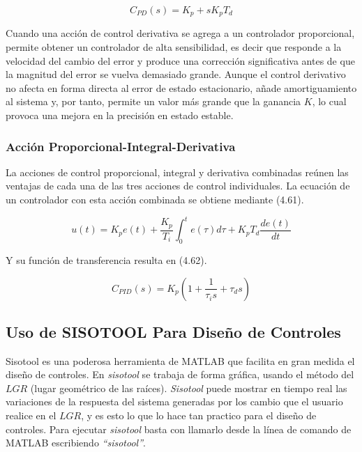 \documentclass[a4paper,12pt,twoside]{proyectotanquesecci}
\begin{document}
\begin{equation}
C_{PD}(s)=K_{p}+sK_{p}T_{d}
\end{equation}

Cuando una acción de control derivativa se agrega a un controlador proporcional, permite obtener un controlador de alta sensibilidad, es decir que responde a la velocidad del cambio del error y produce una corrección significativa antes de que la magnitud del error se vuelva demasiado grande. Aunque el control derivativo no afecta en forma directa al error de estado estacionario, añade amortiguamiento al sistema y, por tanto, permite un valor más grande que la ganancia $K$, lo cual provoca una mejora en la precisión en estado estable.

\subsubsection*{Acción Proporcional-Integral-Derivativa}

La acciones de control proporcional, integral y derivativa combinadas reúnen las ventajas de cada una de las tres acciones de control individuales. La ecuación de un controlador con esta acción combinada se obtiene mediante (4.61).

\begin{equation}
u(t)=K_{p}e(t)+ \frac{K_{p}}{T_{i}} \int ^{t}_{0} e(\tau )d\tau +K_{p}T_{d} \frac{de(t)}{dt}
\end{equation}

Y su función de transferencia resulta en (4.62).

\begin{equation}
C_{PID}\left( s\right) =K_{p}\left( 1+\frac{1}{\tau _{i}s}+\tau _{d}s\right)
\end{equation}

\subsection{Uso de SISOTOOL Para Diseño de Controles}

Sisotool es una poderosa herramienta de MATLAB que facilita en gran medida el diseño de controles. En \textit{sisotool} se trabaja de forma gráfica, usando el  método del $LGR$ (lugar geométrico de las raíces). \textit{Sisotool} puede mostrar en tiempo real las variaciones  de la respuesta del sistema generadas por los cambio que el usuario realice en el $LGR$, y es esto lo que lo hace tan practico para el diseño de controles. Para ejecutar \textit{sisotool} basta con llamarlo desde la línea de comando de MATLAB  escribiendo \textit{“sisotool”}. \\
\end{document}
